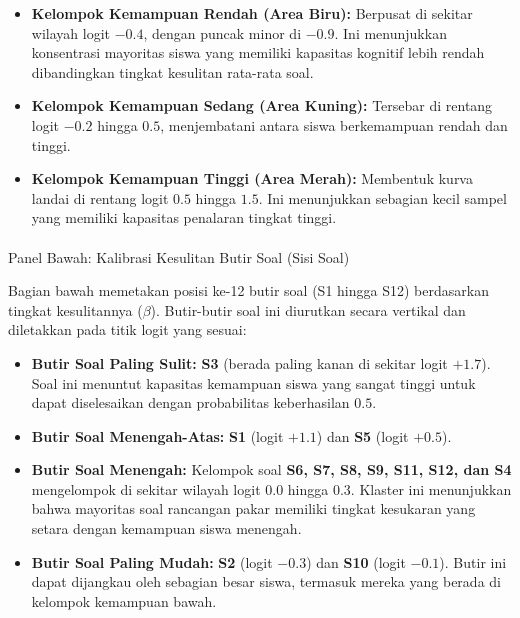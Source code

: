 \documentclass[
]{article}
\makeatletter
\let\oldparagraph\paragraph
\renewcommand{\paragraph}{
    \@ifstar
      \xxxParagraphStar
      \xxxParagraphNoStar
  }
\newcommand{\xxxParagraphStar}[1]{\oldparagraph*{#1}\mbox{}}
\newcommand{\xxxParagraphNoStar}[1]{\oldparagraph{#1}\mbox{}}
\makeatother
\begin{document}
\begin{itemize}
\item
  \textbf{Kelompok Kemampuan Rendah (Area Biru):} Berpusat di sekitar
  wilayah logit \(-0.4\), dengan puncak minor di \(-0.9\). Ini
  menunjukkan konsentrasi mayoritas siswa yang memiliki kapasitas
  kognitif lebih rendah dibandingkan tingkat kesulitan rata-rata soal.
\item
  \textbf{Kelompok Kemampuan Sedang (Area Kuning):} Tersebar di rentang
  logit \(-0.2\) hingga \(0.5\), menjembatani antara siswa berkemampuan
  rendah dan tinggi.
\item
  \textbf{Kelompok Kemampuan Tinggi (Area Merah):} Membentuk kurva
  landai di rentang logit \(0.5\) hingga \(1.5\). Ini menunjukkan
  sebagian kecil sampel yang memiliki kapasitas penalaran tingkat
  tinggi.
\end{itemize}

\paragraph{Panel Bawah: Kalibrasi Kesulitan Butir Soal (Sisi
Soal)}\label{panel-bawah-kalibrasi-kesulitan-butir-soal-sisi-soal}

Bagian bawah memetakan posisi ke-12 butir soal (S1 hingga S12)
berdasarkan tingkat kesulitannya (\(\beta\)). Butir-butir soal ini
diurutkan secara vertikal dan diletakkan pada titik logit yang sesuai:

\begin{itemize}
\item
  \textbf{Butir Soal Paling Sulit:} \textbf{S3} (berada paling kanan di
  sekitar logit \(+1.7\)). Soal ini menuntut kapasitas kemampuan siswa
  yang sangat tinggi untuk dapat diselesaikan dengan probabilitas
  keberhasilan \(0.5\).
\item
  \textbf{Butir Soal Menengah-Atas:} \textbf{S1} (logit \(+1.1\)) dan
  \textbf{S5} (logit \(+0.5\)).
\item
  \textbf{Butir Soal Menengah:} Kelompok soal \textbf{S6, S7, S8, S9,
  S11, S12, dan S4} mengelompok di sekitar wilayah logit \(0.0\) hingga
  \(0.3\). Klaster ini menunjukkan bahwa mayoritas soal rancangan pakar
  memiliki tingkat kesukaran yang setara dengan kemampuan siswa
  menengah.
\item
  \textbf{Butir Soal Paling Mudah:} \textbf{S2} (logit \(-0.3\)) dan
  \textbf{S10} (logit \(-0.1\)). Butir ini dapat dijangkau oleh sebagian
  besar siswa, termasuk mereka yang berada di kelompok kemampuan bawah.
\end{itemize}
\end{document}
